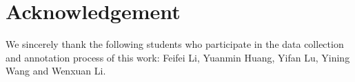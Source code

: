 \section*{Acknowledgement}
We sincerely thank the following students who participate in the data collection and annotation process of this work: Feifei Li, Yuanmin Huang, Yifan Lu, Yining Wang and Wenxuan Li. 